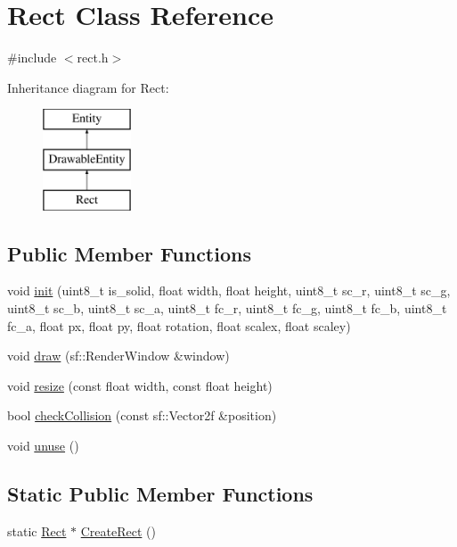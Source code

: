 \hypertarget{class_rect}{}\section{Rect Class Reference}
\label{class_rect}


{\ttfamily \#include $<$rect.\+h$>$}

Inheritance diagram for Rect\+:\begin{figure}[H]
\begin{center}
\leavevmode
\includegraphics[height=3.000000cm]{class_rect}
\end{center}
\end{figure}
\subsection*{Public Member Functions}
\begin{DoxyCompactItemize}
\item 
void \hyperlink{class_rect_aa780623e4639a2679ed300424142d50d}{init} (uint8\+\_\+t is\+\_\+solid, float width, float height, uint8\+\_\+t sc\+\_\+r, uint8\+\_\+t sc\+\_\+g, uint8\+\_\+t sc\+\_\+b, uint8\+\_\+t sc\+\_\+a, uint8\+\_\+t fc\+\_\+r, uint8\+\_\+t fc\+\_\+g, uint8\+\_\+t fc\+\_\+b, uint8\+\_\+t fc\+\_\+a, float px, float py, float rotation, float scalex, float scaley)
\item 
void \hyperlink{class_rect_aa131d780f6ebb75e9057c01221486adc}{draw} (sf\+::\+Render\+Window \&window)
\item 
void \hyperlink{class_rect_ab7593e78f2fbc2354d8ef832ac3625a7}{resize} (const float width, const float height)
\item 
bool \hyperlink{class_rect_afb4fd23ac0ebf55ef7d9c1bcdcc7ff30}{check\+Collision} (const sf\+::\+Vector2f \&position)
\item 
void \hyperlink{class_rect_a31c7cbadb97080dfb559f3d04acc0bc9}{unuse} ()
\end{DoxyCompactItemize}
\subsection*{Static Public Member Functions}
\begin{DoxyCompactItemize}
\item 
static \hyperlink{class_rect}{Rect} $\ast$ \hyperlink{class_rect_ac9283327c926d453d0cd5a49ded8d150}{Create\+Rect} ()
\end{DoxyCompactItemize}
